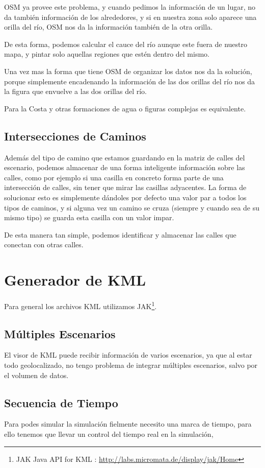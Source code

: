 OSM ya provee este problema, y cuando pedimos la información de un lugar, no da
también información de los alrededores, y si en nuestra zona solo aparece una
orilla del río, OSM nos da la información también de la otra orilla.

De esta forma, podemos calcular el cauce del río aunque este fuera de nuestro
mapa, y pintar solo aquellas regiones que estén dentro del mismo.

Una vez mas la forma que tiene OSM de organizar los datos nos da la solución,
porque simplemente encadenando la información de las dos orillas del río nos da
la figura que envuelve a las dos orillas del río.

Para la Costa y otras formaciones de agua o figuras complejas es equivalente.
\subsection*{Intersecciones de Caminos} \label{Intersecciones}
Además del tipo de camino que estamos guardando en la matriz de calles del
escenario, podemos almacenar de una forma inteligente información sobre las
calles, como por ejemplo si una casilla en concreto forma parte de una
intersección de calles, sin tener que mirar las casillas adyacentes. La forma
de solucionar esto es simplemente dándoles por defecto una valor par a todos
los tipos de caminos, y si alguna vez un camino se cruza (siempre y cuando sea
de su mismo tipo) se guarda esta casilla con un valor impar.

De esta manera tan simple, podemos identificar y almacenar las calles que
conectan con otras calles.

\section*{Generador de KML}
Para general los archivos KML utilizamos
JAK\footnote{JAK Java API for KML :
\url{http://labs.micromata.de/display/jak/Home}}.
\subsection*{Múltiples Escenarios}
El visor de KML puede recibir información de varios escenarios, ya que al estar
todo geolocalizado, no tengo problema de integrar múltiples
escenarios, salvo por el volumen de datos.
\subsection*{Secuencia de Tiempo}
Para podes simular la simulación fielmente necesito una marca de tiempo, para
ello tenemos que llevar un control del tiempo real en la simulación, 

